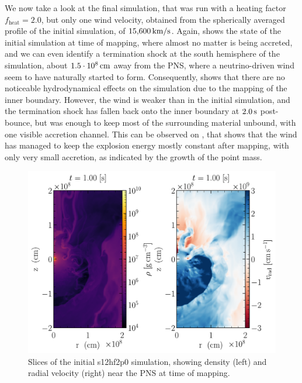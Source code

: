 We now take a look at the final simulation, that was run with a heating factor \(f_\mathrm{heat} = 2.0\), but only one wind velocity, obtained from the spherically averaged profile of the initial simulation, of \(15{,}600\,\mathrm{km/s}\). Again,  shows the state of the initial simulation at time of mapping, where almost no matter is being accreted, and we can even identify a termination shock at the south hemisphere of the simulation, about \(1.5 \cdot 10^8\,\mathrm{cm}\) away from the PNS, where a neutrino-driven wind seem to have naturally started to form. Consequently,  shows that there are no noticeable hydrodynamical effects on the simulation due to the mapping of the inner boundary. However, the wind is weaker than in the initial simulation, and the termination shock has fallen back onto the inner boundary at \(2.0\,\mathrm{s}\) post-bounce, but was enough to keep most of the surrounding material unbound, with one visible accretion channel. This can be observed on , that shows that the wind has managed to keep the explosion energy mostly constant after mapping, with only very small accretion, as indicated by the growth of the point mass.

\begin{figure}
    \centering
    \includegraphics[width=1.0\linewidth]{figures/s12hf2p0_og.pdf}
    \caption{Slices of the initial s12hf2p0 simulation, showing density (left) and radial velocity (right) near the PNS at time of mapping.}
    \label{fig:s12hf2p0_og}
\end{figure}


